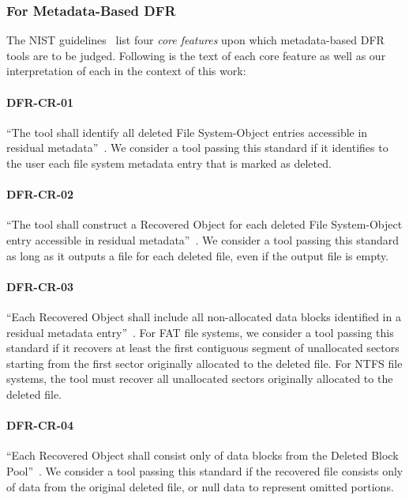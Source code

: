 \subsubsection{For Metadata-Based DFR}
\begin{paraphrase}
 The NIST guidelines~\cite{meta:dfr:standards} list four \emph{core features} upon which metadata-based DFR tools are to be judged.
Following is the text of each core feature as well as our interpretation of each in the context of this work:

 \paragraph{DFR-CR-01} ``The tool shall identify all deleted File System-Object entries accessible in residual metadata''~\cite{meta:dfr:standards}.
 We consider a tool passing this standard if it identifies to the user each file system metadata entry that is marked as deleted.
 \paragraph{DFR-CR-02} ``The tool shall construct a Recovered Object for each deleted File System-Object entry accessible in residual metadata''~\cite{meta:dfr:standards}.
 We consider a tool passing this standard as long as it outputs a file for each deleted file, even if the output file is empty.
 \paragraph{DFR-CR-03} ``Each Recovered Object shall include all non-allocated data blocks identified in a residual metadata entry''~\cite{meta:dfr:standards}.
 For FAT file systems, we consider a tool passing this standard if it recovers at least the first contiguous segment of unallocated sectors starting 
from the first sector originally allocated to the deleted file. For NTFS file systems, the tool must recover all unallocated sectors originally allocated to the deleted file.
 \paragraph{DFR-CR-04} ``Each Recovered Object shall consist only of data blocks from the Deleted Block Pool''~\cite{meta:dfr:standards}.
 We consider a tool passing this standard if the recovered file consists only of data from the original deleted file, or null data to represent omitted portions.


\end{paraphrase}

